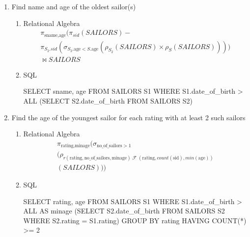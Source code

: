 \begin{enumerate}
    \item Find name and age of the oldest sailor(s)

          \begin{enumerate}
              \item Relational Algebra
                    \begin{multline*}
                        \pi_{\text{sname}, \text{age}}(\pi_{sid}(SAILORS) - \\
                        \pi_{S_2.sid}(\sigma_{S_2.\text{age} < S.\text{age}}(\rho_{S_2}(SAILORS) \times \rho_{S}(SAILORS)))) \\
                        \bowtie SAILORS
                    \end{multline*}
              \item SQL

                    \begin{sqlQuery}{}
                        SELECT sname, age FROM SAILORS S1
                        WHERE S1.date_of_birth > ALL
                                (SELECT S2.date_of_birth FROM SAILORS S2)
                    \end{sqlQuery}

          \end{enumerate}

		\item  Find the age of the youngest sailor for each rating with at least 2 such sailors

			\begin{enumerate}
				\item Relational Algebra
					\begin{multline*}
						\pi_{\text{rating}, \text{minage}}(\sigma_{\text{no\_of\_sailors} > 1} \\
						(\rho_{r (\text{rating}, \text{no\_of\_sailors}, \text{minage}) \; \mathcal{F} \; (\text{rating}, count(\text{sid}), min(\text{age}))} \\
						(SAILORS))) 
					\end{multline*}
				\item SQL

					\begin{sqlQuery}{}
						SELECT rating, age FROM SAILORS S1
						WHERE S1.date_of_birth > ALL AS minage
								(SELECT S2.date_of_birth FROM SAILORS S2
								WHERE S2.rating = S1.rating)
						GROUP BY rating
						HAVING COUNT(*) >= 2
					\end{sqlQuery}
			\end{enumerate}

\end{enumerate}


\pagebreak
